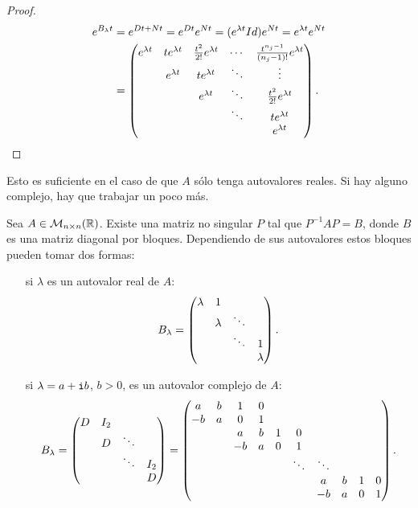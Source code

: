 \documentclass[../ecuaciones_diferenciales.tex]{subfiles}
\begin{document}
\begin{proof}
	\begin{align*}
		e^{B_\lambda t} &= e^{Dt + Nt} = e^{Dt} e^{Nt} 
			= (e^{\lambda t} Id) e^{Nt} = e^{\lambda t}e^{Nt} \\
			&= \begin{pmatrix}e^{\lambda t} & te^{\lambda t} & \frac{t^2}{2!}e^{\lambda t} & \cdots & \frac{t^{n_j-1}}{(n_j-1)!}e^{\lambda t} \\
				& e^{\lambda t} & te^{\lambda t}              & \ddots & \vdots                    \\
				&   & e^{\lambda t}              & \ddots & \frac{t^2}{2!}e^{\lambda t}            \\
				&   &                & \ddots & te^{\lambda t}                         \\
				&   &                &        & e^{\lambda t} \end{pmatrix}.
	\end{align*}
\end{proof}

Esto es suficiente en el caso de que \(A\) sólo tenga autovalores reales. Si
hay alguno complejo, hay que trabajar un poco más.

\begin{theorem}
	Sea \(A \in \mathcal{M}_{n \times n}(\mathbb{R})\). Existe una matriz no singular
	\(P\) tal que \(P^{-1}AP = B\), donde \(B\) es una matriz diagonal por
	bloques. Dependiendo de sus autovalores estos bloques pueden tomar dos
	formas:
	\begin{enumerate}[align=left]
		\item[si \(\lambda\) es un autovalor real de \(A\):] 
			\[B_\lambda = \begin{pmatrix}\lambda & 1 & & \\ & \lambda & \ddots & \\ & & \ddots & 1 \\ & & & \lambda\end{pmatrix}.\]

		\item[si \(\lambda = a + \mathtt{i} b\), \(b > 0\),
			es un autovalor complejo de \(A\):]
			\[B_\lambda = 
				\begin{pmatrix}D & I_2 & & \\ & D & \ddots & \\ & & \ddots &
				I_2 \\ & & & D\end{pmatrix}
				= \begin{pmatrix}a & b & 1 & 0 \\ -b & a & 0 & 1 
					\\ && a & b & 1 & 0 \\ && -b & a & 0 & 1
					\\ &&&&& \ddots & \ddots 
					 \\ &&&&&& a & b & 1 & 0 \\ &&&&&& -b & a & 0 & 1\end{pmatrix}.\]
	\end{enumerate}
\end{theorem}
\end{document}
